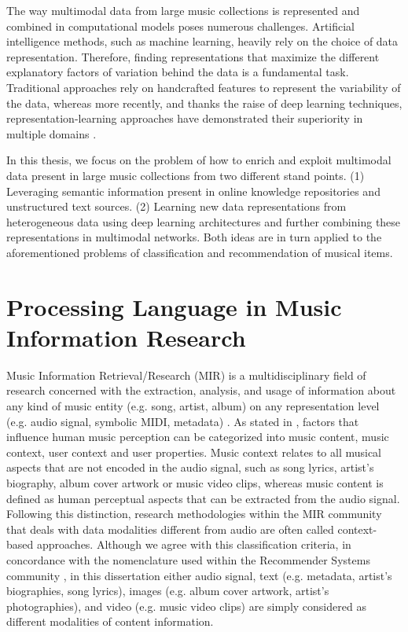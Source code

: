 The way multimodal data from large music collections is represented and combined in computational models poses numerous challenges. Artificial intelligence methods, such as machine learning, heavily rely on the choice of data representation. Therefore, finding representations that maximize the different explanatory factors of variation behind the data is a fundamental task. Traditional approaches rely on handcrafted features to represent the variability of the data, whereas more recently, and thanks the raise of deep learning techniques, representation-learning approaches have demonstrated their superiority in multiple domains \cite{bengio2013representation}.

In this thesis, we focus on the problem of how to enrich and exploit multimodal data present in large music collections from two different stand points. (1) Leveraging semantic information present in online knowledge repositories and unstructured text sources. (2) Learning new data representations from heterogeneous data using deep learning architectures and further combining these representations in multimodal networks. Both ideas are in turn applied to the aforementioned problems of classification and recommendation of musical items.


\section{Processing Language in Music Information Research}
\label{sec:intro:nlp}

Music Information Retrieval/Research (MIR) is a multidisciplinary field of research concerned with the extraction, analysis, and usage of information about any kind of music entity (e.g. song, artist, album) on any representation level (e.g. audio signal, symbolic MIDI, metadata) \cite{schedl2008}. As stated in \cite{Schedl2013}, factors that influence human music perception can be categorized into music content, music context, user context and user properties. Music context relates to all musical aspects that are not encoded in the audio signal, such as song lyrics, artist's biography, album cover artwork or music video clips, whereas music content is defined as human perceptual aspects that can be extracted from the audio signal. Following this distinction, research methodologies within the MIR community that deals with data modalities different from audio are often called context-based approaches. 
Although we agree with this classification criteria, in concordance with the nomenclature used within the Recommender Systems community \cite{Ostuni2013}, in this dissertation either audio signal, text (e.g. metadata, artist's biographies, song lyrics), images (e.g. album cover artwork, artist's photographies), and video (e.g. music video clips) are simply considered as different modalities of content information.

